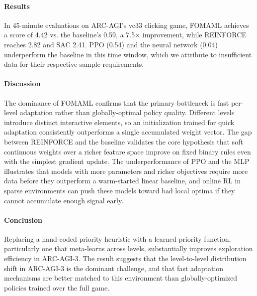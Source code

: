\documentclass{article}
\begin{document}
\begin{titlepage}
\paragraph{Results} In 45-minute evaluations on ARC-AGI's vc33 clicking game, FOMAML achieves a score of 4.42 vs. the baseline's 0.59, a 7.5× improvement, while REINFORCE reaches 2.82 and SAC 2.41. PPO (0.54) and the neural network (0.04) underperform the baseline in this time window, which we attribute to insufficient data for their respective sample requirements.

\paragraph{Discussion} The dominance of FOMAML confirms that the primary bottleneck is fast per-level adaptation rather than globally-optimal policy quality. Different levels introduce distinct interactive elements, so an initialization trained for quick adaptation consistently outperforms a single accumulated weight vector. The gap between REINFORCE and the baseline validates the core hypothesis that soft continuous weights over a richer feature space improve on fixed binary rules even with the simplest gradient update. The underperformance of PPO and the MLP illustrates that models with more parameters and richer objectives require more data before they outperform a warm-started linear baseline, and online RL in sparse environments can push these models toward bad local optima if they cannot accumulate enough signal early.

\paragraph{Conclusion} Replacing a hand-coded priority heuristic with a learned priority function, particularly one that meta-learns across levels, substantially improves exploration efficiency in ARC-AGI-3. The result suggests that the level-to-level distribution shift in ARC-AGI-3 is the dominant challenge, and that fast adaptation mechanisms are better matched to this environment than globally-optimized policies trained over the full game. 

\end{titlepage}

\maketitle
\end{document}

